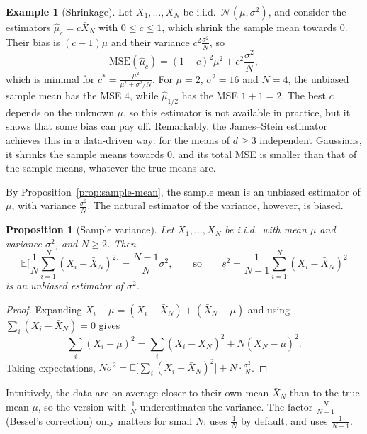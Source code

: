 \documentclass[11pt]{article}
\newcommand{\py}[1]{\texttt{\detokenize{#1}}}
\newcommand{\E}{\mathbb{E}}
\theoremstyle{definition}
\newtheorem{example}[definition]{Example}
\theoremstyle{plain}
\newtheorem{proposition}[definition]{Proposition}
\theoremstyle{remark}
\begin{document}
\begin{example}[Shrinkage]\label{ex:shrinkage}
    Let $X_1, \ldots, X_N$ be i.i.d.\ $\mathcal{N}(\mu, \sigma^2)$, and consider the estimators $\hat\mu_c = c\bar X_N$ with $0 \leq c \leq 1$, which shrink the sample mean towards $0$. Their bias is $(c - 1)\mu$ and their variance $c^2\frac{\sigma^2}{N}$, so
    \[\mathrm{MSE}(\hat\mu_c) = (1 - c)^2\mu^2 + c^2\frac{\sigma^2}{N},\]
    which is minimal for $c^* = \frac{\mu^2}{\mu^2 + \sigma^2/N}$. For $\mu = 2$, $\sigma^2 = 16$ and $N = 4$, the unbiased sample mean has the MSE $4$, while $\hat\mu_{1/2}$ has the MSE $1 + 1 = 2$. The best $c$ depends on the unknown $\mu$, so this estimator is not available in practice, but it shows that some bias can pay off. Remarkably, the James--Stein estimator achieves this in a data-driven way: for the means of $d \geq 3$ independent Gaussians, it shrinks the sample means towards $0$, and its total MSE is smaller than that of the sample means, whatever the true means are.
\end{example}

By Proposition~\ref{prop:sample-mean}, the sample mean is an unbiased estimator of $\mu$, with variance $\frac{\sigma^2}{N}$. The natural estimator of the variance, however, is biased.

\begin{proposition}[Sample variance]\label{prop:sample-variance}
    Let $X_1, \ldots, X_N$ be i.i.d.\ with mean $\mu$ and variance $\sigma^2$, and $N \geq 2$. Then
    \[\E\Big[\frac{1}{N}\sum_{i=1}^N (X_i - \bar X_N)^2\Big] = \frac{N - 1}{N}\sigma^2, \qquad \text{so} \qquad s^2 = \frac{1}{N - 1}\sum_{i=1}^N (X_i - \bar X_N)^2\]
    is an unbiased estimator of $\sigma^2$.
\end{proposition}

\begin{proof}
    Expanding $X_i - \mu = (X_i - \bar X_N) + (\bar X_N - \mu)$ and using $\sum_i (X_i - \bar X_N) = 0$ gives
    \[\sum_i (X_i - \mu)^2 = \sum_i (X_i - \bar X_N)^2 + N(\bar X_N - \mu)^2.\]
    Taking expectations, $N\sigma^2 = \E\big[\sum_i (X_i - \bar X_N)^2\big] + N \cdot \frac{\sigma^2}{N}$.
\end{proof}

Intuitively, the data are on average closer to their own mean $\bar X_N$ than to the true mean $\mu$, so the version with $\frac{1}{N}$ underestimates the variance. The factor $\frac{N}{N - 1}$ (Bessel's correction) only matters for small $N$; \py{np.var} uses $\frac{1}{N}$ by default, and \py{np.var(x, ddof=1)} uses $\frac{1}{N - 1}$.
\end{document}
